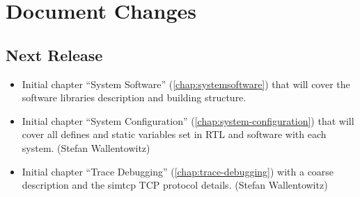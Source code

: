 \section*{Document Changes}

\subsection*{Next Release} %
\begin{itemize}
\item Initial chapter ``System Software'' (\ref{chap:systemsoftware})
  that will cover the software libraries description and building structure.
\item Initial chapter ``System Configuration''
  (\ref{chap:system-configuration}) that will cover all defines and
  static variables set in RTL and software with each system. (Stefan Wallentowitz)
\item Initial chapter ``Trace Debugging'' (\ref{chap:trace-debugging})
  with a coarse description and the simtcp TCP protocol details.
  (Stefan Wallentowitz)
\end{itemize}

